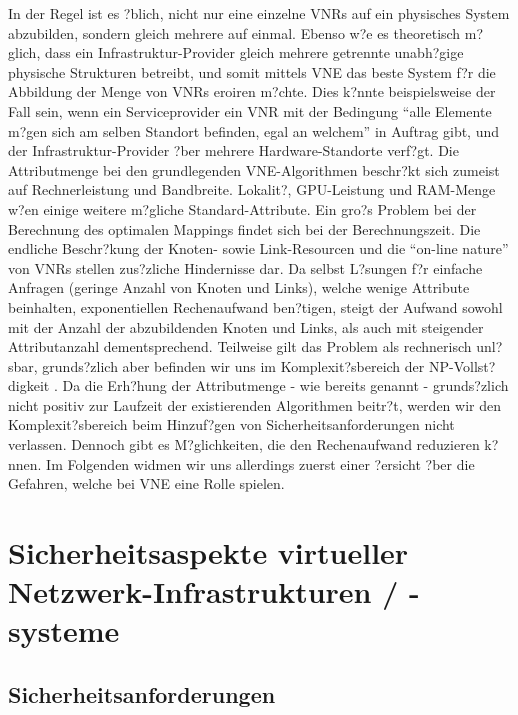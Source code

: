 \documentclass{lni}
\begin{document}
In der Regel ist es ?blich, nicht nur eine einzelne VNRs auf ein physisches System abzubilden, sondern gleich mehrere auf einmal. Ebenso w?e es theoretisch m?glich, dass ein Infrastruktur-Provider gleich mehrere getrennte unabh?gige physische Strukturen betreibt, und somit mittels VNE das beste System f?r die Abbildung der Menge von VNRs eroiren m?chte. Dies k?nnte beispielsweise der Fall sein, wenn ein Serviceprovider ein VNR mit der Bedingung "`alle Elemente m?gen sich am selben Standort befinden, egal an welchem"' in Auftrag gibt, und der Infrastruktur-Provider ?ber mehrere Hardware-Standorte verf?gt.
\newline
Die Attributmenge bei den grundlegenden VNE-Algorithmen beschr?kt  sich zumeist auf Rechnerleistung und Bandbreite. 
Lokalit?, GPU-Leistung und RAM-Menge w?en einige weitere m?gliche Standard-Attribute. Ein gro?s Problem bei der Berechnung des optimalen Mappings findet sich bei der Berechnungszeit. Die endliche Beschr?kung der Knoten- sowie Link-Resourcen und die "`on-line nature"' von VNRs stellen zus?zliche Hindernisse dar. Da selbst L?sungen f?r einfache Anfragen (geringe Anzahl von Knoten und Links), welche wenige Attribute beinhalten, exponentiellen Rechenaufwand ben?tigen, steigt der Aufwand sowohl mit der Anzahl der abzubildenden Knoten und Links, als auch mit steigender Attributanzahl dementsprechend. Teilweise gilt das Problem als rechnerisch unl?sbar, grunds?zlich aber befinden wir uns im Komplexit?sbereich der NP-Vollst?digkeit \cite{SVNE2}. Da die Erh?hung der Attributmenge - wie bereits genannt - grunds?zlich nicht positiv zur Laufzeit der existierenden Algorithmen beitr?t, werden wir den Komplexit?sbereich beim Hinzuf?gen von Sicherheitsanforderungen nicht verlassen. Dennoch gibt es M?glichkeiten, die den Rechenaufwand reduzieren k?nnen. Im Folgenden widmen wir uns allerdings zuerst einer ?ersicht ?ber die Gefahren, welche bei VNE eine Rolle spielen.



\section{Sicherheitsaspekte virtueller Netzwerk-Infrastrukturen / -systeme}
\label{sec:gefahren}

\subsection{Sicherheitsanforderungen}
\label{subsec:gefahren_anforderungen}

\end{document}
